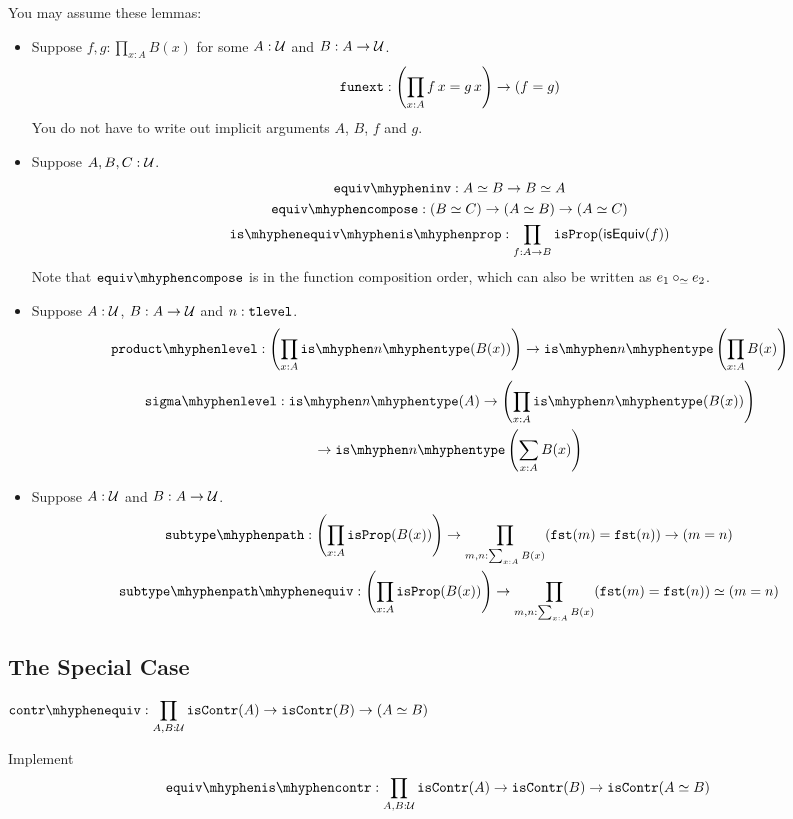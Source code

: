 \documentclass[12pt]{article}
\begin{document}
You may assume these lemmas:
\begin{itemize}
  \item
    Suppose $f, g: \prod_{x:A} B(x)$ for some $A : \mathcal{U}$ and $B : A \to \mathcal{U}$.
    \[
      \mathtt{funext} : \left(\prod_{x:A} f\,x = g\,x \right) \to (f = g)
    \]
    You do not have to write out implicit arguments $A$, $B$, $f$ and $g$.
  \item
    Suppose $A, B, C : \mathcal{U}$.
    \begin{gather*}
      \equivinv : A \eqv B \to B \eqv A
      \\
      \equivcompose : (B \eqv C) \to (A \eqv B) \to (A \eqv C)
      \\
      \isequivisprop : \prod_{f:A\to B}\isprop(\isequiv(f))
    \end{gather*}
    Note that $\equivcompose$ is in the function composition order,
    which can also be written as $e_1 \mathbin{\mathbin{\circ}_\simeq} e_2$.
  \item
    Suppose $A : \mathcal{U}$, $B : A \to \mathcal{U}$ and $n : \mathtt{tlevel}$.
    \[
      \productlevel :
      \left(\prod_{x:A}\istype{n}(B(x))\right) \to \istype{n}\left(\prod_{x:A}B(x)\right)
    \]
    \begin{multline*}
      \sigmalevel :
      \istype{n}(A)
      \to
      \left(\prod_{x:A}\istype{n}(B(x))\right)
      \\
      \to
      \istype{n}\left(\sum_{x:A}B(x)\right)
    \end{multline*}
  \item
    Suppose $A : \mathcal{U}$ and $B : A \to \mathcal{U}$.
    \begin{gather*}
      \subtypepath :
      \left(\prod_{x{:}A} \isprop(B(x))\right)
      \to
      \prod_{m,n:\sum_{x:A}B(x)}
      (\fst(m)=\fst(n))
      \to
      (m = n)
      \\
      \subtypepatheqiv :
      \left(\prod_{x{:}A} \isprop(B(x))\right)
      \to
      \prod_{m,n:\sum_{x:A}B(x)}
      (\fst(m)=\fst(n))
      \eqv
      (m = n)
    \end{gather*}
\end{itemize}

\subsection{The Special Case}

\begin{task}
  $\displaystyle
    \contrequiv :
    \prod_{A,B:\U}
    \iscontr(A) \to
    \iscontr(B) \to
    (A \eqv B)
  $
\end{task}
\begin{task} Implement
  \[
    \equiviscontr :
    \prod_{A,B:\U}
    \iscontr(A) \to \iscontr(B) \to \iscontr(A \eqv B)
  \]
\end{task}
\end{document}
